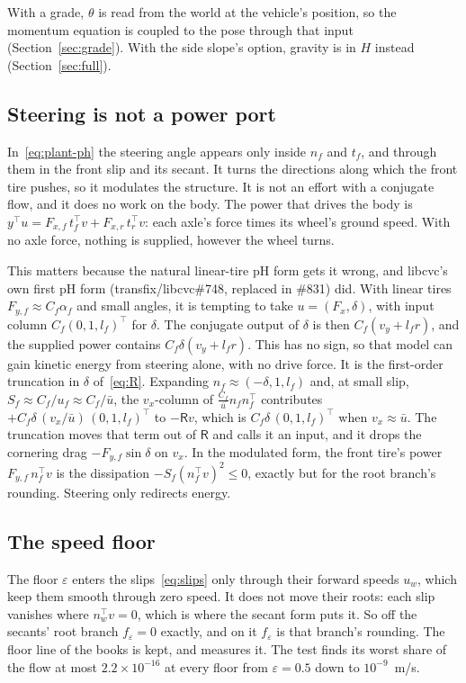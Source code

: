 \documentclass[11pt]{article}
\theoremstyle{remark}
\newcommand{\R}{\mathsf R}
\newcommand{\ub}{\bar u}
\newcommand{\T}{^{\top}}
\begin{document}
With a grade, $\theta$ is read from the world at the vehicle's position, so the momentum equation
is coupled to the pose through that input (Section~\ref{sec:grade}). With the side slope's option,
gravity is in $H$ instead (Section~\ref{sec:full}).

\subsection{Steering is not a power port}
\label{sec:steer}
In~\eqref{eq:plant-ph} the steering angle appears only inside $n_f$ and $t_f$, and through them in
the front slip and its secant. It turns the directions along which the front tire pushes, so it
modulates the structure. It is not an effort with a conjugate flow, and it does no work on the body. The power
that drives the body is $y\T u=F_{x,f}\,t_f\T v+F_{x,r}\,t_r\T v$: each axle's force times its
wheel's ground speed. With no axle force, nothing is supplied, however the wheel turns.

This matters because the natural linear-tire pH form gets it wrong, and libcvc's own first pH form
(transfix/libcvc\#748, replaced in \#831) did. With linear tires $F_{y,f}\approx C_f\alpha_f$ and
small angles, it is tempting to take $u=(F_x,\delta)$, with input column $C_f(0,1,l_f)\T$ for
$\delta$. The conjugate output of $\delta$ is then $C_f(v_y+l_fr)$, and the supplied power
contains $C_f\delta(v_y+l_fr)$. This has no sign, so that model can gain kinetic energy from
steering alone, with no drive force. It is the first-order truncation in $\delta$
of~\eqref{eq:R}. Expanding $n_f\approx(-\delta,1,l_f)$ and, at small slip, $S_f\approx C_f/u_f\approx
C_f/\ub$, the $v_x$-column of $\tfrac{C_f}{\ub}n_fn_f\T$ contributes $+C_f\delta\,(v_x/\ub)\,(0,1,l_f)\T$
to $-\R v$, which is $C_f\delta\,(0,1,l_f)\T$ when $v_x\approx\ub$. The truncation moves that term
out of $\R$ and calls it an input, and it drops the cornering drag $-F_{y,f}\sin\delta$ on $v_x$. In
the modulated form, the front tire's power $F_{y,f}\,n_f\T v$ is the dissipation
$-S_f(n_f\T v)^2\le0$, exactly but for the root branch's rounding. Steering only redirects
energy.

\subsection{The speed floor}
\label{sec:floor}
The floor $\varepsilon$ enters the slips~\eqref{eq:slips} only through their forward speeds $u_w$,
which keep them smooth through zero speed. It does not move their roots: each slip vanishes where
$n_w\T v=0$, which is where the secant form puts it. So off the secants' root branch
$f_\varepsilon=0$ exactly, and on it $f_\varepsilon$ is that branch's rounding. The floor line of
the books is kept, and measures it. The test  finds its
worst share of the flow at most $2.2\times10^{-16}$ at every floor from $\varepsilon=0.5$ down to
$10^{-9}$~m/s.
\end{document}
